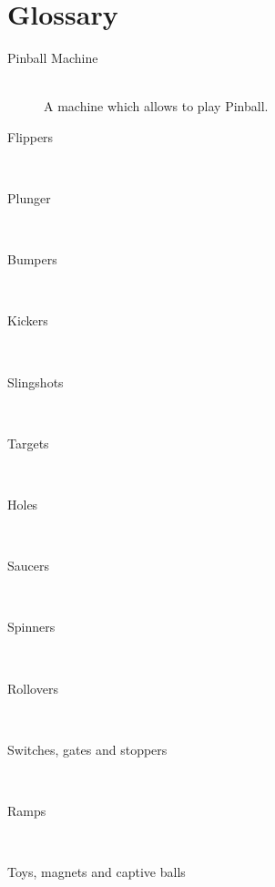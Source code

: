 \documentclass[fontsize=12pt,
               paper=a4,
               twoside=false,
               parskip=half,
               ]{scrartcl}
\begin{document}
\newcommand{\doctitle}{Glossary}


\section*{Glossary}

\begin{description}


\item[Pinball Machine] \hfill \\
A machine which allows to play Pinball.

\item[Flippers] \hfill \\

\item[Plunger] \hfill \\

\item[Bumpers] \hfill \\

\item[Kickers] \hfill \\

\item[Slingshots] \hfill \\

\item[Targets] \hfill \\

\item[Holes] \hfill \\

\item[Saucers] \hfill \\

\item[Spinners] \hfill \\

\item[Rollovers] \hfill \\

\item[Switches, gates and stoppers] \hfill \\

\item[Ramps] \hfill \\

\item[Toys, magnets and captive balls] \hfill \\

\end{description}
\end{document}
